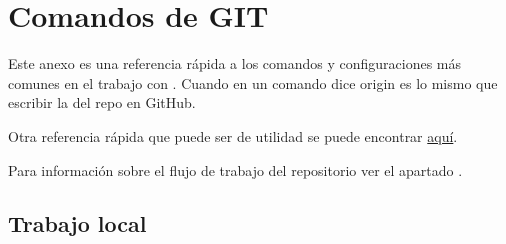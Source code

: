
\section{Comandos de GIT}\label{anexo-git}

Este anexo es una referencia rápida a los comandos y configuraciones más comunes en el trabajo con . Cuando en un comando dice origin es lo mismo que escribir la  del repo en GitHub.

\noindent Otra referencia rápida que puede ser de utilidad se puede encontrar \href{https://rogerdudler.github.io/git-guide}{aquí}.

\noindent Para información sobre el flujo de trabajo del repositorio ver el apartado .


\subsection{Trabajo local}

